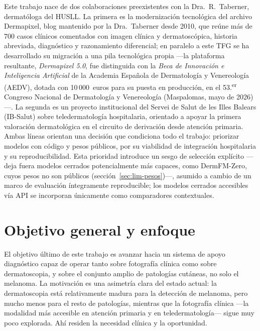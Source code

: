 Este trabajo nace de dos colaboraciones preexistentes con la
Dra.~R.~Taberner, dermatóloga del HUSLL. La primera es la
modernización tecnológica del archivo Dermapixel, blog mantenido por
la Dra.~Taberner desde 2010, que reúne más de $700$ casos clínicos
comentados con imagen clínica y dermatoscópica, historia abreviada,
diagnóstico y razonamiento diferencial; en paralelo a este TFG se ha
desarrollado su migración a una pila tecnológica propia ---la plataforma
resultante, \emph{Dermapixel 5.0}, fue distinguida con la \emph{Beca de
Innovación e Inteligencia Artificial} de la Academia Española de
Dermatología y Venereología (AEDV), dotada con 10\,000~euros para su
puesta en producción, en el 53.\textsuperscript{er} Congreso Nacional de
Dermatología y Venereología (Maspalomas, mayo de 2026)---. La segunda
es un proyecto institucional del Servei de Salut de les Illes Balears
(IB-Salut) sobre teledermatología hospitalaria, orientado a apoyar la
primera valoración dermatológica en el circuito de derivación desde
atención primaria. \label{sec:trabajo-previo}Ambas líneas orientan
una decisión que condiciona todo el trabajo: priorizar modelos con
código y pesos públicos, por su viabilidad de integración
hospitalaria y su reproducibilidad. Esta prioridad introduce un sesgo
de selección explícito ---deja fuera modelos cerrados potencialmente
más capaces, como DermFM-Zero, cuyos pesos no son públicos
(sección~\ref{sec:lim-pesos})---, asumido a cambio de un marco de
evaluación íntegramente reproducible; los modelos cerrados accesibles
vía API se incorporan únicamente como comparadores contextuales.

\section{Objetivo general y enfoque}
\label{sec:objetivos}

El objetivo último de este trabajo es avanzar hacia un sistema de
apoyo diagnóstico capaz de operar tanto sobre fotografía clínica como
sobre dermatoscopia, y sobre el conjunto amplio de patologías
cutáneas, no solo el melanoma. La motivación es una asimetría clara
del estado actual: la dermatoscopia está relativamente madura para la
detección de melanoma, pero mucho menos para el resto de patologías,
mientras que la fotografía clínica ---la modalidad más accesible en
atención primaria y en teledermatología--- sigue muy poco explorada.
Ahí residen la necesidad clínica y la oportunidad.

